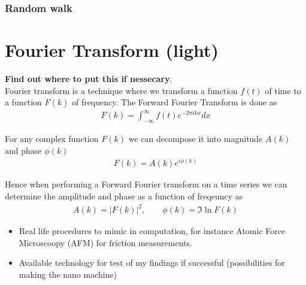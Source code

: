 \subsubsection{Random walk}






\section{Fourier Transform (light)}

\textbf{Find out where to put this if nessecary}. \\

Fourier transform is a technique where we transform a function $f(t)$ of time to
a function $F(k)$ of frequency. The Forward Fourier Transform is done as
\begin{align*}
  F(k) = \int_{-\infty}^\infty f(t) e^{-2\pi ikx} dx
\end{align*}

For any complex function $F(k)$ we can decompose it into magnitude $A(k)$ and
phase $\phi(k)$
\begin{align*}
  F(k) = A(k) e^{i \phi(k)}
\end{align*}

Hence when performing a Forward Fourier transform on a time series we can
determine the amplitude and phase as a function of freqeuncy as 
\begin{align*}
  A(k) = |F(k)|^2, \qquad \phi(k) = \Im{\ln{F(k)}}
\end{align*}






\begin{itemize}
  \item Real life procedures to mimic in computation, for instance Atomic Force
  Microscoopy (AFM) for friction measurements.
  \item Available technology for test of my findings if successful
  (possibilities for making the nano machine) 
\end{itemize}


